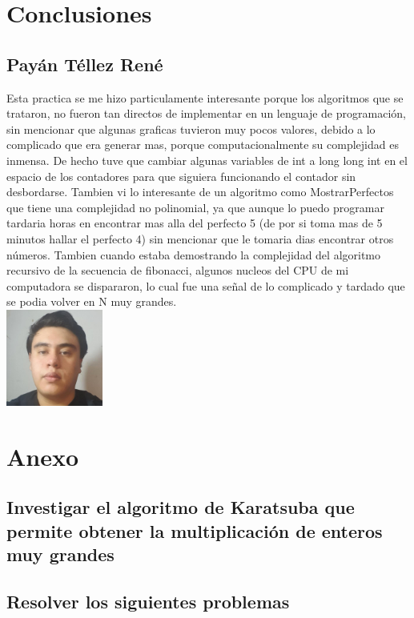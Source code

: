 \documentclass[spanish]{article}
\begin{document}
	\section{Conclusiones}			
	\subsection{Payán Téllez René}
	Esta practica se me hizo particulamente interesante porque los algoritmos que se trataron, no fueron tan directos de implementar en un lenguaje de programación, sin mencionar que algunas graficas tuvieron muy pocos valores, debido a lo complicado que era generar mas, porque computacionalmente su complejidad es inmensa. De hecho tuve que cambiar algunas variables de int a long long int en el espacio de los contadores para que siguiera funcionando el contador sin desbordarse. Tambien vi lo interesante de un algoritmo como MostrarPerfectos que tiene una complejidad no polinomial, ya que aunque lo puedo programar tardaria horas en encontrar mas alla del perfecto 5 (de por si toma mas de 5 minutos hallar el perfecto 4) sin mencionar que le tomaria dias encontrar otros números. Tambien cuando estaba demostrando la complejidad del algoritmo recursivo de la secuencia de fibonacci, algunos nucleos del CPU de mi computadora se dispararon, lo cual fue una señal de lo complicado y tardado que se podia volver en N muy grandes.\\
	\includegraphics[height=120px,width=120px]{Rene}
	\section{Anexo}			
	\subsection{Investigar el algoritmo de Karatsuba que permite obtener la multiplicación de enteros muy grandes}
	\subsection{Resolver los siguientes problemas}
\end{document}
